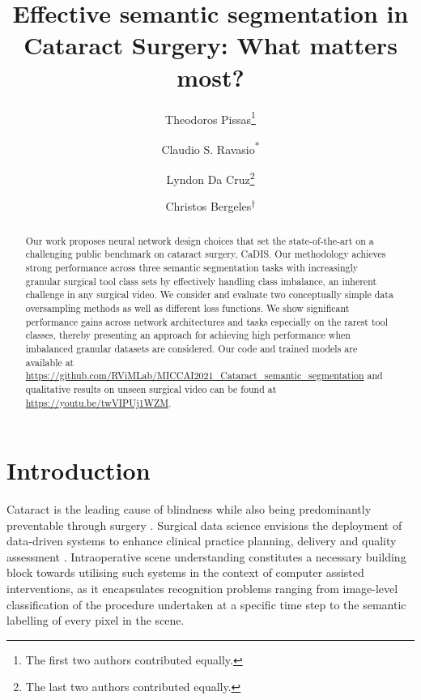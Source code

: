 \documentclass[runningheads]{llncs}
\begin{document}
\title{Effective semantic segmentation in Cataract Surgery: What matters most?}

\author{Theodoros Pissas\thanks{The first two authors contributed equally.} \and
Claudio S. Ravasio\textsuperscript{*} \and \authorcr
Lyndon Da Cruz\thanks{The last two authors contributed equally.} \and
Christos Bergeles\textsuperscript{$\dagger$}}




\maketitle              \begin{abstract}

Our work proposes neural network design choices that set the state-of-the-art on a challenging public benchmark on cataract surgery, CaDIS. Our methodology achieves strong performance across three semantic segmentation tasks with increasingly granular surgical tool class sets by effectively handling class imbalance, an inherent challenge in any surgical video. We consider and evaluate two conceptually simple data oversampling methods as well as different loss functions. We show significant performance gains across network architectures and tasks especially on the rarest tool classes, thereby presenting an approach for achieving high performance when imbalanced granular datasets are considered. Our code and trained models are available at \url{https://github.com/RViMLab/MICCAI2021_Cataract_semantic_segmentation} and qualitative results on unseen surgical video can be found at \url{https://youtu.be/twVIPUj1WZM}.
\end{abstract}

\section{Introduction}\label{intro}
Cataract is the leading cause of blindness \cite{WHO_blindness} while also being predominantly preventable through surgery \cite{wang2016cataract}. Surgical data science envisions the deployment of data-driven systems to enhance clinical practice planning, delivery and quality assessment \cite{SDSc2020}. Intraoperative scene understanding constitutes a necessary building block towards utilising such systems in the context of computer assisted interventions, as it encapsulates recognition problems ranging from image-level classification of the procedure undertaken at a specific time step to the semantic labelling of every pixel in the scene.
\end{document}
